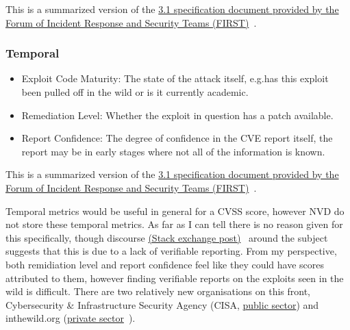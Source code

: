 \documentclass[12pt]{article}
\begin{document}
{\footnotesize This is a summarized version of the
\href{https://www.first.org/cvss/v3.1/specification-document}{3.1 specification document
	provided by the  Forum of Incident Response and Security Teams (FIRST)}~\cite{CVSS_31}. } \\

\subsubsection*{Temporal}

\begin{itemize}

	\item Exploit Code Maturity: The state of the attack itself, e.g.\@ has this exploit been pulled
	      off in the wild or is it currently academic.

	\item Remediation Level: Whether the exploit in question has a patch available.

	\item Report Confidence: The degree of confidence in the CVE report itself, the report may be in
	      early stages where not all of the information is known.

\end{itemize}

{\footnotesize This is a summarized version of the
\href{https://www.first.org/cvss/v3.1/specification-document}{3.1 specification document
	provided by the Forum of Incident Response and Security Teams (FIRST)}~\cite{CVSS_31}.}  \\
\bigskip

Temporal metrics would be useful in general for a CVSS score, however NVD do not store these
temporal metrics. As far as I can tell there is no reason given for this specifically, though
discourse
\href{https://security.stackexchange.com/questions/270257/cvss-v3-and-v3-1-missing-temporal-metrics-exploit-code-maturity-and-remediation}{(Stack exchange post)}~\cite{stack_exchange} around the subject suggests that this is due to a lack
of verifiable reporting. From my perspective, both remidiation level and report confidence feel like
they could have scores attributed to them, however finding verifiable reports on the exploits seen
in the wild is difficult. There are two relatively new organisations on this front,
Cybersecurity \& Infrastructure Security Agency (CISA,
\href{https://www.cisa.gov/known-exploited-vulnerabilities-catalog}{public sector}) and
inthewild.org (\href{https://inthewild.io/}{private sector}~\cite{cisa}).
\end{document}
